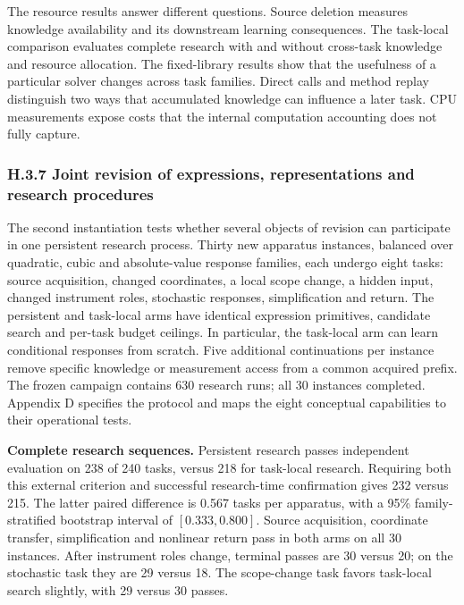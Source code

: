 \documentclass[11pt,a4paper]{article}
\begin{document}
The resource results answer different questions. Source deletion measures knowledge availability and its downstream learning consequences. The task-local comparison evaluates complete research with and without cross-task knowledge and resource allocation. The fixed-library results show that the usefulness of a particular solver changes across task families. Direct calls and method replay distinguish two ways that accumulated knowledge can influence a later task. CPU measurements expose costs that the internal computation accounting does not fully capture.


\subsubsection*{H.3.7 Joint revision of expressions, representations and research procedures}

The second instantiation tests whether several objects of revision can participate
in one persistent research process. Thirty new apparatus instances, balanced over
quadratic, cubic and absolute-value response families, each undergo eight tasks:
source acquisition, changed coordinates, a local scope change, a hidden input,
changed instrument roles, stochastic responses, simplification and return. The
persistent and task-local arms have identical expression primitives, candidate
search and per-task budget ceilings. In particular, the task-local arm can learn
conditional responses from scratch. Five additional continuations per instance
remove specific knowledge or measurement access from a common acquired prefix.
The frozen campaign contains 630 research runs; all 30 instances completed.
Appendix D specifies the protocol and maps the eight conceptual capabilities to
their operational tests.


\textbf{Complete research sequences.} Persistent research passes independent evaluation
on 238 of 240 tasks, versus 218 for task-local research. Requiring both this
external criterion and successful research-time confirmation gives 232 versus
215. The latter paired difference is 0.567 tasks per apparatus, with a 95\%
family-stratified bootstrap interval of \([0.333,0.800]\). Source acquisition,
coordinate transfer, simplification and nonlinear return pass in both arms on
all 30 instances. After instrument roles change, terminal passes are 30 versus
20; on the stochastic task they are 29 versus 18. The scope-change task favors
task-local search slightly, with 29 versus 30 passes.
\end{document}
